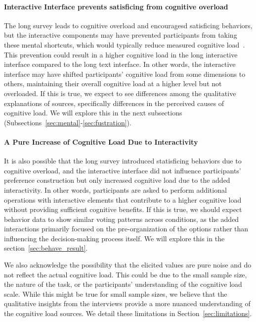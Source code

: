 \paragraph{Interactive Interface prevents satisficing from cognitive overload} The long survey leads to cognitive overload and encouragesd satisficing behaviors, but the interactive components may have prevented participants from taking these mental shortcuts, which would typically reduce measured cognitive load~\cite{daniel2017thinking, simonBehavioralModelRational1955, payneAdaptiveStrategySelection1988, tverskyJudgmentsRepresentativeness}. This prevention could result in a higher cognitive load in the long interactive interface compared to the long text interface. In other words, the interactive interface may have shifted participants' cognitive load from some dimensions to others, maintaining their overall cognitive load at a higher level but not overloaded. If this is true, we expect to see differences among the qualitative explanations of sources, specifically differences in the perceived causes of cognitive load. We will explore this in the next subsections (Subsections~\ref{sec:mental}-\ref{sec:fustration}).

\paragraph{A Pure Increase of Cognitive Load Due to Interactivity} It is also possible that the long survey introduced statisficing behaviors due to cognitive overload, and the interactive interface did not influence participants' preference construction but only increased cognitive load due to the added interactivity. In other words, participants are asked to perform additional operations with interactive elements that contribute to a higher cognitive load without providing sufficient cognitive benefits. If this is true, we should expect behavior data to show similar voting patterns across conditions, as the added interactions primarily focused on the pre-organization of the options rather than influencing the decision-making process itself. We will explore this in the section~\ref{sec:behave_result}.

We also acknowledge the possibility that the elicited values are pure noise and do not reflect the actual cognitive load. This could be due to the small sample size, the nature of the task, or the participants' understanding of the cognitive load scale. While this might be true for small sample sizes, we believe that the qualitative insights from the interviews provide a more nuanced understanding of the cognitive load sources. We detail these limitations in Section~\ref{sec:limitations}.

